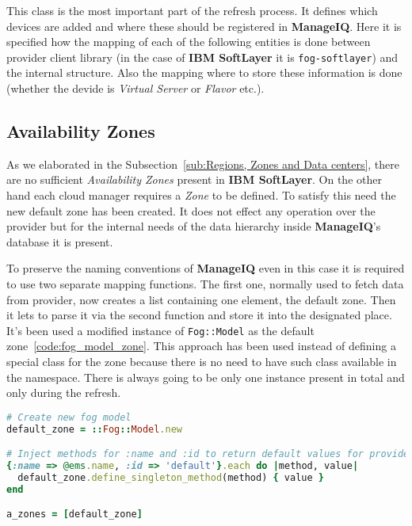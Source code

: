 This class is the most important part of the refresh process. It defines which devices are added and where these should be registered in \textbf{ManageIQ}. Here it is specified how the mapping of each of the following entities is done between provider client library (in the case of \textbf{IBM SoftLayer} it is \texttt{fog-softlayer}) and the internal structure. Also the mapping where to store these information is done (whether the devide is \emph{Virtual Server} or \emph{Flavor} etc.).

\subsection{Availability Zones}
\label{sub:Availability Zones}

As we elaborated in the Subsection~\ref{sub:Regions, Zones and Data centers}, there are no sufficient \emph{Availability Zones} present in \textbf{IBM SoftLayer}. On the other hand each cloud manager requires a \emph{Zone} to be defined. To satisfy this need the new default zone has been created. It does not effect any operation over the provider but for the internal needs of the data hierarchy inside \textbf{ManageIQ}'s database it is present.

To preserve the naming conventions of \textbf{ManageIQ} even in this case it is required to use two separate mapping functions. The first one, normally used to fetch data from provider, now creates a list containing one element, the default zone. Then it lets to parse it via the second function and store it into the designated place. It's been used a modified instance of \texttt{Fog::Model} as the default zone~\ref{code:fog_model_zone}. This approach has been used instead of defining a special class for the zone because there is no need to have such class available in the namespace. There is always going to be only one instance present in total and only during the refresh.

\begin{lstlisting}[language=Ruby,caption={Declaration of the default \emph{Availability Zone}},label=code:fog_model_zone,float=htpb]
# Create new fog model
default_zone = ::Fog::Model.new

# Inject methods for :name and :id to return default values for provider
{:name => @ems.name, :id => 'default'}.each do |method, value|
  default_zone.define_singleton_method(method) { value }
end

a_zones = [default_zone]
\end{lstlisting}

